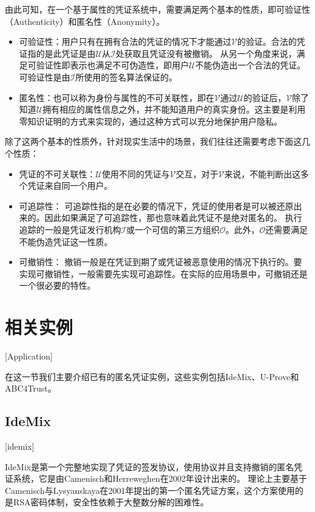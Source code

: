 由此可知，在一个基于属性的凭证系统中，需要满足两个基本的性质，即可验证性（Authenticity）和匿名性（Anonymity）。

\begin{itemize}
  \item 可验证性：用户只有在拥有合法的凭证的情况下才能通过$\mathcal{V}$的验证。合法的凭证指的是此凭证是由$\mathcal{U}$从$\mathcal{I}$处获取且凭证没有被撤销。
  从另一个角度来说，满足可验证性即表示也满足不可伪造性，即用户$\mathcal{U}$不能伪造出一个合法的凭证。可验证性是由$\mathcal{I}$所使用的签名算法保证的。
  \item 匿名性：也可以称为身份与属性的不可关联性，即在$\mathcal{V}$通过$\mathcal{U}$的验证后，$\mathcal{V}$除了知道$\mathcal{U}$拥有相应的属性信息之外，并不能知道用户的真实身份。这主要是利用零知识证明的方式来实现的，通过这种方式可以充分地保护用户隐私。
\end{itemize}

除了这两个基本的性质外，针对现实生活中的场景，我们往往还需要考虑下面这几个性质：

\begin{itemize}
  \item 凭证的不可关联性：$\mathcal{U}$使用不同的凭证与$\mathcal{V}$交互，对于$\mathcal{V}$来说，不能判断出这多个凭证来自同一个用户。
  \item 可追踪性： 可追踪性指的是在必要的情况下，凭证的使用者是可以被还原出来的。因此如果满足了可追踪性，那也意味着此凭证不是绝对匿名的。
  执行追踪的一般是凭证发行机构$\mathcal{I}$或一个可信的第三方组织$\mathcal{O}$。此外，$\mathcal{O}$还需要满足不能伪造凭证这一性质。
  \item 可撤销性： 撤销一般是在凭证到期了或凭证被恶意使用的情况下执行的。要实现可撤销性，一般需要先实现可追踪性。在实际的应用场景中，可撤销还是一个很必要的特性。
\end{itemize}

\section{相关实例}[Application]

在这一节我们主要介绍已有的匿名凭证实例，这些实例包括IdeMix、U-Prove和ABC4Trust。

\subsection{IdeMix}[idemix]

IdeMix\cite{camenisch2002design}是第一个完整地实现了凭证的签发协议，使用协议并且支持撤销的匿名凭证系统，它是由Camenisch和Herreweghen在2002年设计出来的。
理论上主要基于Camenisch与Lysyanskaya在2001年提出的第一个匿名凭证方案\cite{camenisch2001efficient}，这个方案使用的是RSA密码体制，安全性依赖于大整数分解的困难性。

